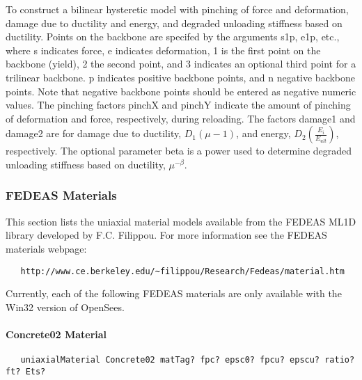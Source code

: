 \documentclass[12pt]{article}
\begin{document}
\noindent To construct a bilinear hysteretic model with pinching of force and
deformation, damage due to ductility and energy, and degraded unloading 
stiffness based on ductility. Points on the backbone are specifed by the
arguments s1p, e1p, etc., where s indicates force, e indicates deformation,
1 is the first point on the backbone (yield), 2 the second point, and 3 indicates
an optional third point for a trilinear backbone. p indicates positive backbone
points, and n negative backbone points. Note that negative backbone points
should be entered as negative numeric values. The pinching factors pinchX and
pinchY indicate the amount of pinching of deformation and force, respectively,
during reloading. The factors damage1 and damage2 are for damage due 
to ductility, $D_1(\mu-1)$, and energy, $D_2(\frac{E_i}{E_{ult}})$, respectively. 
The optional parameter beta is a power used to determine degraded
unloading stiffness based on ductility, $\mu^{-\beta}$.



\subsubsection{FEDEAS Materials}
This section lists the uniaxial material models available from the FEDEAS ML1D
library developed by F.C. Filippou. For more information see the FEDEAS materials webpage:

{\sf\small
\begin{verbatim}
   http://www.ce.berkeley.edu/~filippou/Research/Fedeas/material.htm
\end{verbatim}
}

\noindent Currently, each of the following FEDEAS materials are only available
with the Win32 version of OpenSees.

\paragraph{Concrete02 Material}
{\sf\small
\begin{verbatim}
   uniaxialMaterial Concrete02 matTag? fpc? epsc0? fpcu? epscu? ratio? ft? Ets?
\end{verbatim}
}
\end{document}
